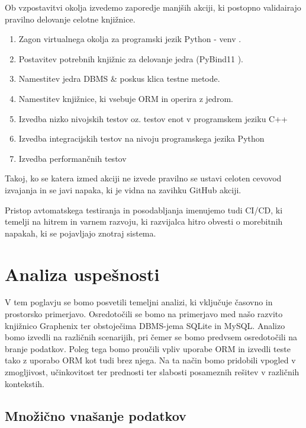\documentclass[a4paper,12pt,openright]{book}
\begin{document}
   Ob vzpostavitvi okolja izvedemo zaporedje manjših akciji, ki postopno validairajo pravilno delovanje celotne knjižnice.
   \begin{enumerate}
       \item Zagon virtualnega okolja za programski jezik Python - venv \cite{PY_VENV_DOCS}.
       \item Postavitev potrebnih knjižnic za delovanje jedra (PyBind11 \cite{PYBIND11_GITHUB}).
       \item Namestitev jedra DBMS \& poskus klica testne metode.
       \item Namestitev knjižnice, ki vsebuje ORM in operira z jedrom.
       \item Izvedba nizko nivojskih testov oz. testov enot v programskem jeziku C++
       \item Izvedba integracijskih testov na nivoju programskega jezika Python
       \item Izvedba performančnih testov
   \end{enumerate}

    \noindent
   Takoj, ko se katera izmed akciji ne izvede pravilno se ustavi celoten cevovod izvajanja in se javi napaka, ki je vidna na zavihku GitHub akciji.

   Pristop avtomatskega testiranja in posodabljanja imenujemo tudi CI/CD, ki temelji na hitrem in varnem razvoju, ki razvijalca hitro obvesti o morebitnih napakah, ki se pojavljajo znotraj sistema.
    
\chapter{Analiza uspešnosti}
\label{ch2}

    V tem poglavju se bomo posvetili temeljni analizi, ki vključuje časovno in prostorsko primerjavo. Osredotočili se bomo na primerjavo med našo razvito knjižnico Graphenix ter obstoječima DBMS-jema SQLite in MySQL. Analizo bomo izvedli na različnih scenarijih, pri čemer se bomo predvsem osredotočili na branje podatkov. Poleg tega bomo proučili vpliv uporabe ORM in izvedli teste tako z uporabo ORM kot tudi brez njega. Na ta način bomo pridobili vpogled v zmogljivost, učinkovitost ter prednosti ter slabosti posameznih rešitev v različnih kontekstih.

    \newpage
   \section{Množično vnašanje podatkov}
\end{document}
